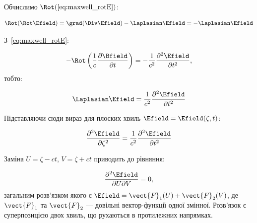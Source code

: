 Обчислимо \(\Rot(\eqref{eq:maxwell_rotE})\):

\begin{equation*}
	\Rot(\Rot\Efield) = \grad (\Div\Efield) - \Laplasian \Efield = -\Laplasian \Efield
\end{equation*}

З~\eqref{eq:maxwell_rotE}:

\begin{equation*}
	-\Rot\left( \frac{1}{c} \frac{\partial \Bfield}{\partial t} \right) = -\frac{1}{c^2} \frac{\partial^2 \Efield}{\partial t^2},
\end{equation*}
%
тобто:

\begin{equation}
	\Laplasian \Efield = \frac{1}{c^2} \frac{\partial^2 \Efield}{\partial t^2}
	\label{eq:wave_equation_E}
\end{equation}

Підставляючи сюди вираз для плоских хвиль \(\Efield = \Efield(\zeta, t)\):

\begin{equation*}
	\frac{\partial^2 \Efield}{\partial\zeta^2} = \frac{1}{c^2} \frac{\partial^2 \Efield}{\partial t^2}
\end{equation*}

Заміна \(U =\zeta - ct\), \(V =\zeta + ct\) приводить до рівняння:

\begin{equation*}
	\frac{\partial^2 \Efield}{\partial U \partial V} = 0,
\end{equation*}
загальним розв'язком якого є \(\Efield = \vect{F}_1(U) + \vect{F}_2(V)\), де \(\vect{F}_1\) та \(\vect{F}_2\) ---
довільні вектор-функції одної змінної. Розв'язок є суперпозицією двох хвиль, що рухаються в протилежних напрямках.

